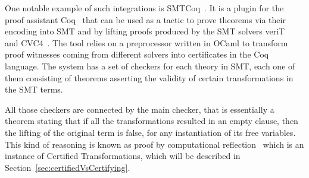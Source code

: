 One notable example of such integrations is SMTCoq~\cite{smtcoq}.
It is a plugin for the proof assistant Coq~\cite{Bertot2004} that
can be used as a tactic to prove theorems via their encoding into
SMT and by lifting proofs produced by the SMT solvers veriT~\cite{Bouton2009}
and CVC4~\cite{Barrett2011}. The tool relies on a preprocessor written in OCaml
to transform proof witnesses coming from different solvers into certificates in
the Coq language. The system has a set of checkers for each theory in SMT, each
one of them consisting of theorems asserting the validity of certain transformations
in the SMT terms.


All those checkers are connected by the main checker, that
is essentially a theorem stating that if all the transformations resulted in an
empty clause, then the lifting of the original term is false, for any instantiation
of its free variables. This kind of reasoning is known as proof by computational
reflection~\cite{reflection} which is an instance of Certified Transformations, which will be described
in Section~\ref{sec:certifiedVsCertifying}.
